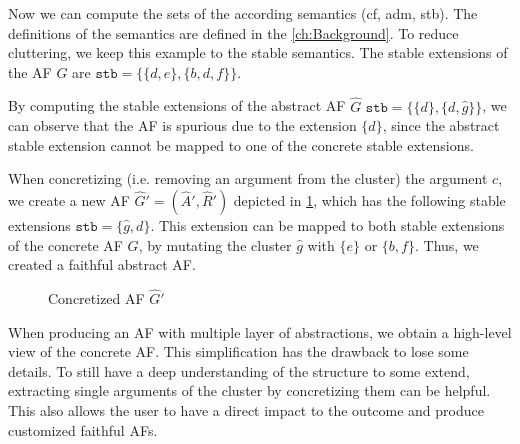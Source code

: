 Now we can compute the sets of the according semantics (cf, adm, stb). The definitions of the semantics are defined in the \cref{ch:Background}. To reduce cluttering, we keep this example to the stable semantics. The stable extensions of the AF $G$ are $\mathtt{stb=}\bigl\{\{d, e\}, \{b, d, f\}\bigl\}$.

By computing the stable extensions of the abstract AF $\hat{G}$ $\mathtt{stb=}\bigl\{\{d\}, \{d, \hat{g}\}\bigl\}$, we can observe that the AF is spurious due to the extension $\{d\}$, since the abstract stable extension cannot be mapped to one of the concrete stable extensions.

When concretizing (i.e. removing an argument from the cluster) the argument $c$, we create a new AF $\hat{G}' = (\hat{A}', \hat{R}')$ depicted in \cref{af:introExample3}, which has the following stable extensions $\mathtt{stb=}\{\hat{g}, d\}$. This extension can be mapped to both stable extensions of the concrete AF $G$, by mutating the cluster $\hat{g}$ with $\{e\}$ or $\{b, f\}$. Thus, we created a faithful abstract AF.

\begin{figure}[h]
    \centering
    \caption{Concretized AF $\hat{G}'$}
    \label{af:introExample3}
\end{figure}


When producing an AF with multiple layer of abstractions, we obtain a high-level view of the concrete AF. This simplification has the drawback to lose some details. To still have a deep understanding of the structure to some extend, extracting single arguments of the cluster by concretizing them can be helpful. This also allows the user to have a direct impact to the outcome and produce customized faithful AFs.


